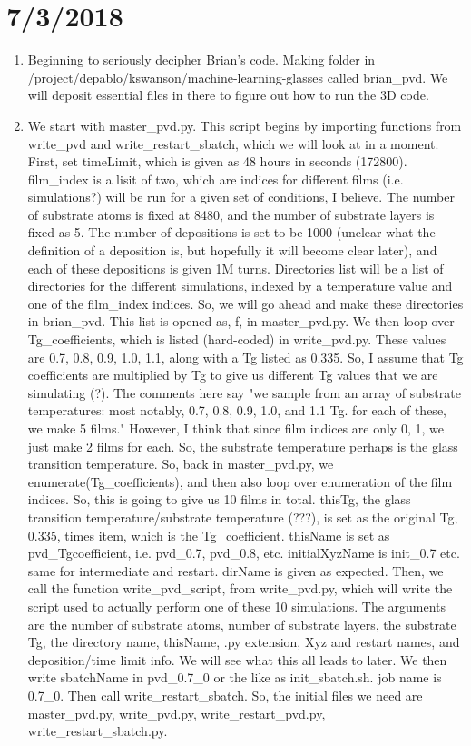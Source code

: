 \documentclass[12pt,reqno]{amsart}
\numberwithin{equation}{section}
\begin{document}
\section{7/3/2018}
\begin{enumerate}
\item Beginning to seriously decipher Brian's code.  Making folder in /project/depablo/kswanson/machine-learning-glasses called brian\_pvd.  We will deposit essential files in there to figure out how to run the 3D code.  
\item We start with master\_pvd.py.  This script begins by importing functions from write\_pvd and write\_restart\_sbatch, which we will look at in a moment.  First, set timeLimit, which is given as 48 hours in seconds (172800).  film\_index is a lisit of two, which are indices for different films (i.e. simulations?) will be run for a given set of conditions, I believe.  The number of substrate atoms is fixed at 8480, and the number of substrate layers is fixed as 5.  The number of depositions is set to be 1000 (unclear what the definition of a deposition is, but hopefully it will become clear later), and each of these depositions is given 1M turns.  Directories list will be a list of directories for the different simulations, indexed by a temperature value and one of the film\_index indices.  So, we will go ahead and make these directories in brian\_pvd.  This list is opened as, f, in master\_pvd.py.  We then loop over Tg\_coefficients, which is listed (hard-coded) in write\_pvd.py.  These values are 0.7, 0.8, 0.9, 1.0, 1.1, along with a Tg listed as 0.335.  So, I assume that Tg coefficients are multiplied by Tg to give us different Tg values that we are simulating (?).  The comments here say "we sample from an array of substrate temperatures: most notably, 0.7, 0.8, 0.9, 1.0, and 1.1 Tg.  for each of these, we make 5 films."  However, I think that since film indices are only 0, 1, we just make 2 films for each.  So, the substrate temperature perhaps is the glass transition temperature.  So, back in master\_pvd.py, we enumerate(Tg\_coefficients), and then also loop over enumeration of the film indices.  So, this is going to give us 10 films in total.  thisTg, the glass transition temperature/substrate temperature (???), is set as the original Tg, 0.335, times item, which is the Tg\_coefficient.  thisName is set as pvd\_Tgcoefficient, i.e. pvd\_0.7, pvd\_0.8, etc.  initialXyzName is init\_0.7 etc.  same for intermediate and restart.  dirName is given as expected.  Then, we call the function write\_pvd\_script, from write\_pvd.py, which will write the script used to actually perform one of these 10 simulations.  The arguments are the number of substrate atoms, number of substrate layers, the substrate Tg, the directory name, thisName, .py extension, Xyz and restart names, and deposition/time limit info.  We will see what this all leads to later.  We then write sbatchName in pvd\_0.7\_0 or the like as init\_sbatch.sh.  job name is 0.7\_0.  Then call write\_restart\_sbatch.  So, the initial files we need are master\_pvd.py, write\_pvd.py, write\_restart\_pvd.py, write\_restart\_sbatch.py.  

\end{enumerate}
\end{document}
